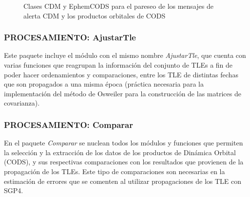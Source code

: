 \begin{figure}[!h]
\centering
  \hspace{1.5cm}
  \caption[Clases CDM y EphemCODS]{Clases CDM y EphemCODS para el pareseo de los mensajes de alerta CDM y los productos orbitales de \ac{CODS}}
\end{figure}

\subsubsection*{PROCESAMIENTO: AjustarTle}
Este paquete incluye el m\'odulo con el mismo nombre {\it{AjustarTle}}, que cuenta con varias funciones que reagrupan la informaci\'on del conjunto de TLEs a fin de poder hacer ordenamientos y comparaciones, entre los TLE de distintas fechas que son propagados a una misma \'epoca (pr\'actica necesaria para la implementaci\'on del m\'etodo de Osweiler para la construcci\'on de las matrices de covarianza).\\

\subsubsection*{PROCESAMIENTO: Comparar}
En el paquete {\it{Comparar}} se nuclean todos los m\'odulos y funciones que permiten la selecci\'on y la extracci\'on de los datos de los productos de Din\'amica Orbital (CODS), y sus respectivas comparaciones con los resultados que provienen de la propagaci\'on de los TLEs. Este tipo de comparaciones son necesarias en la estimaci\'on de errores que se comenten al utilizar propagaciones de los TLE con SGP4. 

